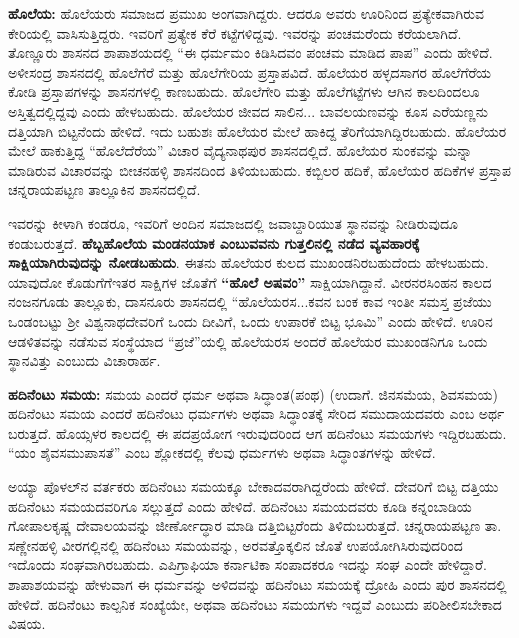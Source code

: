 \newpage

\textbf{ಹೊಲೆಯ:} ಹೊಲೆಯರು ಸಮಾಜದ ಪ್ರಮುಖ ಅಂಗವಾಗಿದ್ದರು. ಆದರೂ ಅವರು ಊರಿನಿಂದ ಪ್ರತ್ಯೇಕವಾಗಿರುವ ಕೇರಿಯಲ್ಲಿ ವಾಸಿಸುತ್ತಿದ್ದರು. ಇವರಿಗೆ ಪ್ರತ್ಯೇಕ ಕೆರೆ ಕಟ್ಟೆಗಳಿದ್ದವು. ಇವರನ್ನು ಪಂಚಮರೆಂದು ಕರೆಯ\-ಲಾಗಿದೆ. ತೊಣ್ಣೂರು ಶಾಸನದ ಶಾಪಾಶಯದಲ್ಲಿ “ಈ ಧರ್ಮಮಂ ಕಿಡಿಸಿದವಂ ಪಂಚಮ ಮಾಡಿದ ಪಾಪ” ಎಂದು ಹೇಳಿದೆ. ಅಳೀಸಂದ್ರ ಶಾಸನದಲ್ಲಿ ಹೊಲೆಗೆರೆ ಮತ್ತು ಹೊಲೆಗೇರಿಯ ಪ್ರಸ್ತಾಪವಿದೆ. ಹೊಲೆಯರ ಹಳ್ಳದಸಾಗರ ಹೊಲೆಗೆರೆಯ ಕೋಡಿ ಪ್ರಸ್ತಾಪಗಳನ್ನು ಶಾಸನಗಳಲ್ಲಿ ಕಾಣಬಹುದು. ಹೊಲೆಗೇರಿ ಮತ್ತು ಹೊಲೆಗಟ್ಟೆಗಳು ಆಗಿನ ಕಾಲದಿಂದಲೂ ಅಸ್ತಿತ್ವದಲ್ಲಿದ್ದವು ಎಂದು ಹೇಳಬಹುದು. ಹೊಲೆಯರ ಜೀವದ ಸಾಲಿನ... ಬಾವಲಯಣವನ್ನು ಕೂಸ ಎರೆಯಣ್ಣನು ದತ್ತಿಯಾಗಿ ಬಿಟ್ಟನೆಂದು ಹೇಳಿದೆ. ಇದು ಬಹುಶಃ ಹೊಲೆಯರ ಮೇಲೆ ಹಾಕಿದ್ದ ತೆರಿಗೆಯಾಗಿದ್ದಿರಬಹುದು. ಹೊಲೆಯರ ಮೇಲೆ ಹಾಕುತ್ತಿದ್ದ “ಹೊಲೆದೆರೆಯ” ವಿಚಾರ ವೈದ್ಯನಾಥಪುರ ಶಾಸನದಲ್ಲಿದೆ. ಹೊಲೆಯರ ಸುಂಕವನ್ನು ಮನ್ನಾ ಮಾಡಿರುವ ವಿಚಾರವನ್ನು ಬೀಚನಹಳ್ಳಿ ಶಾಸನದಿಂದ ತಿಳಿಯಬಹುದು. ಕಬ್ಬಿಲರ ಹದಿಕೆ, ಹೊಲೆಯರ ಹದಿಕೆಗಳ ಪ್ರಸ್ತಾಪ ಚನ್ನರಾಯಪಟ್ಟಣ ತಾಲ್ಲೂಕಿನ ಶಾಸನದಲ್ಲಿದೆ.

ಇವರನ್ನು ಕೀಳಾಗಿ ಕಂಡರೂ, ಇವರಿಗೆ ಅಂದಿನ ಸಮಾಜದಲ್ಲಿ ಜವಾಬ್ದಾರಿಯುತ ಸ್ಥಾನವನ್ನು ನೀಡಿರುವುದೂ ಕಂಡುಬರುತ್ತದೆ. \textbf{ಹೆಬ್ಬಹೊಲೆಯ ಮಂಡನಯಾಕ ಎಂಬುವವನು ಗುತ್ತಲಿನಲ್ಲಿ ನಡೆದ ವ್ಯವಹಾರಕ್ಕೆ ಸಾಕ್ಷಿಯಾಗಿರುವುದನ್ನು ನೋಡಬಹುದು}. ಈತನು ಹೊಲೆಯರ ಕುಲದ ಮುಖಂಡನಿರಬಹುದೆಂದು ಹೇಳಬಹುದು. ಯಾವುದೋ ಕೊಡುಗೆಗೆ\break ಇತರ ಸಾಕ್ಷಿಗಳ ಜೊತೆಗೆ \textbf{“ಹೊಲೆ ಅಷವಂ”} ಸಾಕ್ಷಿಯಾಗಿದ್ದಾನೆ. ವೀರನರಸಿಂಹನ ಕಾಲದ ನಂಜನಗೂಡು ತಾಲ್ಲೂಕು, ದಾಸನೂರು ಶಾಸನದಲ್ಲಿ “ಹೊಲೆಯರಸ...ಕವನ ಬಂಕ ಕಾವ ಇಂತೀ ಸಮಸ್ತ ಪ್ರಜೆಯು ಒಂಡಂಬಟ್ಟು ಶ‍್ರೀ ವಿಶ್ವನಾಥದೇವರಿಗೆ ಒಂದು ದೀವಿಗೆ, ಒಂದು ಉಪಾರಕೆ ಬಿಟ್ಟ ಭೂಮಿ” ಎಂದು ಹೇಳಿದೆ. ಊರಿನ ಆಡಳಿತವನ್ನು ನಡೆಸುವ ಸಂಸ್ಥೆಯಾದ “ಪ್ರಜೆ”ಯಲ್ಲಿ ಹೊಲೆಯರಸ ಅಂದರೆ ಹೊಲೆಯರ ಮುಖಂಡನಿಗೂ ಒಂದು ಸ್ಥಾನವಿತ್ತು ಎಂಬುದು ವಿಚಾರಾರ್ಹ.

\textbf{ಹದಿನೆಂಟು ಸಮಯ:} ಸಮಯ ಎಂದರೆ ಧರ್ಮ ಅಥವಾ ಸಿದ್ಧಾಂತ(ಪಂಥ) (ಉದಾಗೆ. ಜಿನಸಮೆಯ, ಶಿವಸಮಯ) ಹದಿನೆಂಟು ಸಮಯ ಎಂದರೆ ಹದಿನೆಂಟು ಧರ್ಮಗಳು ಅಥವಾ ಸಿದ್ಧಾಂತಕ್ಕೆ ಸೇರಿದ ಸಮುದಾಯದವರು ಎಂಬ ಅರ್ಥ ಬರುತ್ತದೆ. ಹೊಯ್ಸಳರ ಕಾಲದಲ್ಲಿ ಈ ಪದಪ್ರಯೋಗ ಇರುವುದರಿಂದ ಆಗ ಹದಿನೆಂಟು ಸಮಯಗಳು ಇದ್ದಿರಬಹುದು. “ಯಂ ಶೈವಸಮುಪಾಸತೆ” ಎಂಬ ಶ್ಲೋಕದಲ್ಲಿ ಕೆಲವು ಧರ್ಮಗಳು ಅಥವಾ ಸಿದ್ಧಾಂತಗಳನ್ನು ಹೇಳಿದೆ.

ಅಯ್ಯಾ ಪೊಳಲ್​ನ ವರ್ತಕರು ಹದಿನೆಂಟು ಸಮಯಕ್ಕೂ ಬೇಕಾದವರಾಗಿದ್ದರೆಂದು ಹೇಳಿದೆ. ದೇವರಿಗೆ ಬಿಟ್ಟ ದತ್ತಿಯು ಹದಿನೆಂಟು ಸಮಯದವರಿಗೂ ಸಲ್ಲುತ್ತದೆ ಎಂದು ಹೇಳಿದೆ. ಹದಿನೆಂಟು ಸಮಯದವರು ಕೂಡಿ ಕನ್ನಂಬಾಡಿಯ ಗೋಪಾಲಕೃಷ್ಣ ದೇವಾಲಯವನ್ನು ಜೀರ್ಣೋದ್ಧಾರ ಮಾಡಿ ದತ್ತಿಬಿಟ್ಟರೆಂದು ತಿಳಿದುಬರುತ್ತದೆ. ಚನ್ನರಾಯಪಟ್ಟಣ ತಾ. ಸಣ್ಣೇನಹಳ್ಳಿ ವೀರಗಲ್ಲಿನಲ್ಲಿ ಹದಿನೆಂಟು ಸಮಯವನ್ನು, ಅರವತ್ತೊಕ್ಕಲಿನ ಜೊತೆ ಉಪಯೋಗಿಸಿರುವುದರಿಂದ ಇದೊಂದು ಸಂಘವಾಗಿರಬಹುದು. ಎಪಿಗ್ರಾಫಿಯಾ ಕರ್ನಾಟಿಕಾ ಸಂಪಾದಕರೂ ಇದನ್ನು ಸಂಘ ಎಂದೇ ಹೇಳಿದ್ದಾರೆ. ಶಾಪಾಶಯವನ್ನು ಹೇಳುವಾಗ ಈ ಧರ್ಮವನ್ನು ಅಳಿದವನ್ನು ಹದಿನೆಂಟು ಸಮಯಕ್ಕೆ ದ್ರೋಹಿ ಎಂದು ಪುರ ಶಾಸನದಲ್ಲಿ ಹೇಳಿದೆ. ಹದಿನೆಂಟು ಕಾಲ್ಪನಿಕ ಸಂಖ್ಯೆಯೇ, ಅಥವಾ ಹದಿನೆಂಟು ಸಮಯಗಳು ಇದ್ದವೆ ಎಂಬುದು ಪರಿಶೀಲಿಸಬೇಕಾದ ವಿಷಯ.

